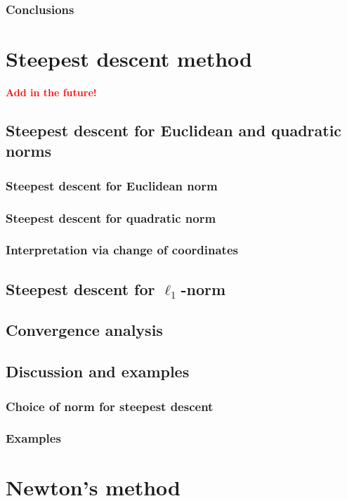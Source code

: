 \subsubsection{Conclusions}

\section{Steepest descent method}
\textcolor{red}{\textbf{Add in the future!}}

\subsection{Steepest descent for Euclidean and quadratic norms}
\subsubsection{Steepest descent for Euclidean norm}
\subsubsection{Steepest descent for quadratic norm}
\subsubsection{Interpretation via change of coordinates}

\subsection{Steepest descent for $\ell_1$-norm}

\subsection{Convergence analysis}

\subsection{Discussion and examples}
\subsubsection{Choice of norm for steepest descent}
\subsubsection{Examples}

\section{Newton's method}

